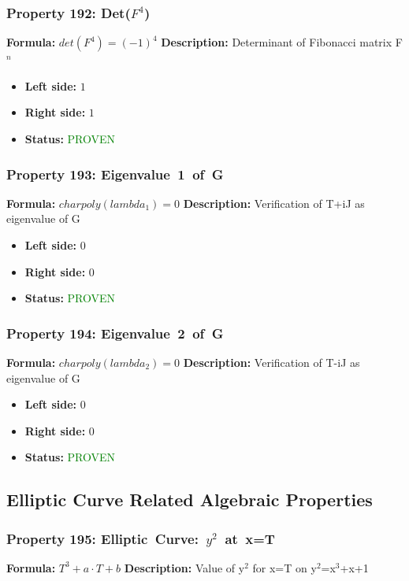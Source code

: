 \subsubsection*{Property 192: Det($F^{4}$)}
\textbf{Formula:} $det(F^4) = (-1)^4$
\textbf{Description:} Determinant of Fibonacci matrix F$^n$

\begin{itemize}
\item \textbf{Left side:} $1$
\item \textbf{Right side:} $1$
\item \textbf{Status:} \textcolor{green}{PROVEN}
\end{itemize}

\subsubsection*{Property 193: Eigenvalue~1~of~G}
\textbf{Formula:} $charpoly(lambda_1) = 0$
\textbf{Description:} Verification of T+iJ as eigenvalue of G

\begin{itemize}
\item \textbf{Left side:} $0$
\item \textbf{Right side:} $0$
\item \textbf{Status:} \textcolor{green}{PROVEN}
\end{itemize}

\subsubsection*{Property 194: Eigenvalue~2~of~G}
\textbf{Formula:} $charpoly(lambda_2) = 0$
\textbf{Description:} Verification of T-iJ as eigenvalue of G

\begin{itemize}
\item \textbf{Left side:} $0$
\item \textbf{Right side:} $0$
\item \textbf{Status:} \textcolor{green}{PROVEN}
\end{itemize}


\subsection{Elliptic Curve Related Algebraic Properties}

\subsubsection*{Property 195: Elliptic~Curve:~$y^{2}$~at~x=T}
\textbf{Formula:} $T^3 + a \cdot T + b$
\textbf{Description:} Value of y$^2$ for x=T on y$^2$=x$^3$+x+1

